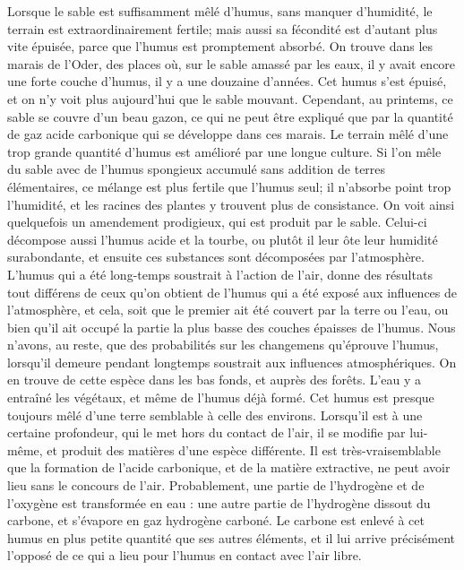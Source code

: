 Lorsque le sable est suffisamment mêlé d'humus, sans manquer d'humidité, le terrain est extraordinairement fertile; mais aussi sa fécondité est d'autant plus vite épuisée, parce que l'humus est promptement absorbé. On trouve dans les marais de l'Oder, des places où, sur le sable amassé par les eaux, il y avait encore une forte couche d'humus, il y a une douzaine d'années. Cet humus s'est épuisé, et on n'y voit plus aujourd'hui que le sable mouvant. Cependant, au printems, ce sable se couvre d'un beau gazon, ce qui ne peut être expliqué que par la quantité de gaz acide carbonique qui se développe dans ces marais. Le terrain mêlé d'une trop grande quantité d'humus est amélioré par une longue culture. Si l'on mêle du sable avec de l'humus spongieux accumulé sans addition de terres élémentaires, ce mélange est plus fertile que l'humus\setcounter{page}{66} seul; il n'absorbe point trop l'humidité, et les racines des plantes y trouvent plus de consistance. On voit ainsi quelquefois un amendement prodigieux, qui est produit par le sable. Celui-ci décompose aussi l'humus acide et la tourbe, ou plutôt il leur ôte leur humidité surabondante, et ensuite ces substances sont décomposées par l'atmosphère. L'humus qui a été long-temps soustrait à l'action de l'air, donne des résultats tout différens de ceux qu'on obtient de l'humus qui a été exposé aux influences de l'atmosphère, et cela, soit que le premier ait été couvert par la terre ou l'eau, ou bien qu'il ait occupé la partie la plus basse des couches épaisses de l'humus. Nous n'avons, au reste, que des probabilités sur les changemens qu'éprouve l'humus, lorsqu'il demeure pendant longtemps soustrait aux influences atmosphériques. On en trouve de cette espèce dans les bas fonds, et auprès des forêts. L'eau y a entraîné les végétaux, et même de l'humus déjà formé. Cet humus est presque toujours mêlé d'une terre semblable à celle des environs. Lorsqu'il est à une certaine profondeur, qui le met hors du contact de l'air, il se modifie par lui-même, et produit des matières d'une espèce\setcounter{page}{67} différente. Il est très-vraisemblable que la formation de l'acide carbonique, et de la matière extractive, ne peut avoir lieu sans le concours de l'air. Probablement, une partie de l'hydrogène et de l'oxygène est transformée en eau : une autre partie de l'hydrogène dissout du carbone, et s'évapore en gaz hydrogène carboné. Le carbone est enlevé à cet humus en plus petite quantité que ses autres éléments, et il lui arrive précisément l'opposé de ce qui a lieu pour l'humus en contact avec l'air libre.
